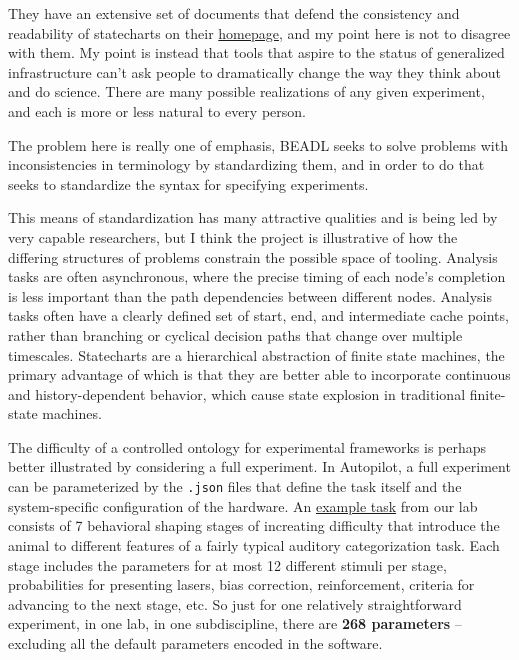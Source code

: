 They have an extensive set of documents that defend the consistency and
readability of statecharts on their
\href{https://statecharts.dev/}{homepage}, and my point here is not to
disagree with them. My point is instead that tools that aspire to the
status of generalized infrastructure can't ask people to dramatically
change the way they think about and do science. There are many possible
realizations of any given experiment, and each is more or less natural
to every person.

The problem here is really one of emphasis, BEADL seeks to solve
problems with inconsistencies in terminology by standardizing them, and
in order to do that seeks to standardize the syntax for specifying
experiments.

This means of standardization has many attractive qualities and is being
led by very capable researchers, but I think the project is illustrative
of how the differing structures of problems constrain the possible space
of tooling. Analysis tasks are often asynchronous, where the precise
timing of each node's completion is less important than the path
dependencies between different nodes. Analysis tasks often have a
clearly defined set of start, end, and intermediate cache points, rather
than branching or cyclical decision paths that change over multiple
timescales. Statecharts are a hierarchical abstraction of finite state
machines, the primary advantage of which is that they are better able to
incorporate continuous and history-dependent behavior, which cause state
explosion in traditional finite-state machines.

The difficulty of a controlled ontology for experimental frameworks is
perhaps better illustrated by considering a full experiment. In
Autopilot, a full experiment can be parameterized by the \texttt{.json}
files that define the task itself and the system-specific configuration
of the hardware. An
\href{https://gist.github.com/sneakers-the-rat/eebe675326a157df49f66f62c4e33a6e}{example
task} from our lab consists of 7 behavioral shaping stages of increating
difficulty that introduce the animal to different features of a fairly
typical auditory categorization task. Each stage includes the parameters
for at most 12 different stimuli per stage, probabilities for presenting
lasers, bias correction, reinforcement, criteria for advancing to the
next stage, etc. So just for one relatively straightforward experiment,
in one lab, in one subdiscipline, there are \textbf{268 parameters} --
excluding all the default parameters encoded in the software.

